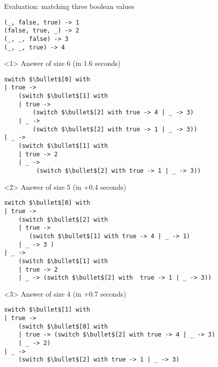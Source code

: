 \documentclass[aspectratio=169
  , xcolor={svgnames}
  , hyperref={ colorlinks,citecolor=Blue
             , linkcolor=DarkRed,urlcolor=DarkBlue}
  , russian
  ]{beamer}
\begin{document}
\begin{frame}[fragile]{Evaluation: matching three boolean values}
\begin{minipage}[c][5cm][t]{0.35\linewidth}
\begin{lstlisting}[basicstyle=\small,belowskip=1em,aboveskip=0em]
(_, false, true) -> 1
(false, true, _) -> 2
(_, _, false) -> 3
(_, _, true) -> 4
\end{lstlisting}
\end{minipage}
\begin{minipage}{0.63\linewidth}
\begin{onlyenv}<1>
Answer of size 6 (in 1.6 seconds)
\begin{lstlisting}[basicstyle=\small,belowskip=0em]
switch $\bullet$[0] with  
| true -> 
    (switch $\bullet$[1] with  
    | true -> 
        (switch $\bullet$[2] with true -> 4 | _ -> 3)
    | _ -> 
        (switch $\bullet$[2] with true -> 1 | _ -> 3))  
| _ -> 
    (switch $\bullet$[1] with  
    | true -> 2   
    | _ -> 
         (switch $\bullet$[2] with true -> 1 | _ -> 3))
\end{lstlisting}
\end{onlyenv}
\begin{onlyenv}<2>
Answer of size 5 (in +0.4 seconds)
\begin{lstlisting}[basicstyle=\small,belowskip=1em]
switch $\bullet$[0] with  
| true -> 
    (switch $\bullet$[2] with  
    | true -> 
       (switch $\bullet$[1] with true -> 4 | _ -> 1)
    | _ -> 3 )  
| _ -> 
    (switch $\bullet$[1] with  
    | true -> 2   
    | _ -> (switch $\bullet$[2] with  true -> 1 | _ -> 3))
\end{lstlisting}
\end{onlyenv}
\begin{onlyenv}<3>
Answer of size 4 (in +0.7 seconds)
\begin{lstlisting}[basicstyle=\small,belowskip=0em]
switch $\bullet$[1] with  
| true -> 
    (switch $\bullet$[0] with  
    | true -> (switch $\bullet$[2] with true -> 4 | _ -> 3)
    | _ -> 2) 
| _ -> 
    (switch $\bullet$[2] with true -> 1 | _ -> 3)
\end{lstlisting}
\end{onlyenv}
\end{minipage}
\end{frame}
\end{document}
